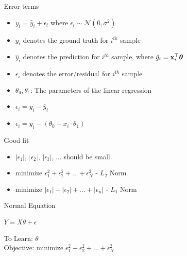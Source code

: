 \documentclass{beamer}
\begin{document}
\begin{frame}{Error terms}


	\begin{itemize}[<+->]
		\item $y_{i} = \hat{y}_{i} + \epsilon_{i}$ where $\epsilon_{i} \sim \mathcal{N}(0, \sigma^2)$
		\item $y_{i}$ denotes the ground truth for $i^{th}$ sample
		\item $\hat{y}_{i}$ denotes the prediction for $i^{th}$ sample, where $\hat{y}_{i} = \mathbf{x}_{i}^\top \boldsymbol{\theta}$
		\item $\epsilon_{i}$ denotes the error/residual for $i^{th}$ sample
		\item $\theta_{0}, \theta_{1}$: The parameters of the linear regression
		\item   $  \epsilon_{i} = y_{i} - \hat{y}_{i}$
		\item     $\epsilon_{i} = y_{i} - (\theta_{0} + x_{i} \cdot \theta_{1})$

\end{itemize}





\end{frame}



\begin{frame}{Good fit}

\begin{itemize}
    \item<+-> $|\epsilon_{1}|$, $|\epsilon_{2}|$, $|\epsilon_{3}|$, ... should be small.
    \item<+-> 
${\text{minimize }} \epsilon_{1}^2 + \epsilon_{2}^2 + \dots + \epsilon_{N}^2$ - $L_{2}$ Norm
    \item<+-> 
${\text{minimize }} |\epsilon_{1}| + |\epsilon_{2}| + \dots + |\epsilon_{n}|$ - $L_{1}$ Norm
\end{itemize}
\end{frame}





\begin{frame}{Normal Equation}
    
    
   \pause  \begin{tcolorbox}
       $ Y = X\theta + \epsilon$
    \end{tcolorbox}
    
    \pause To Learn: $\theta$ \\
    \pause Objective: ${\text{minimize }} \epsilon_{1}^2 + \epsilon_{2}^2 + \dots + \epsilon_{N}^2$  
\end{frame}
\end{document}
